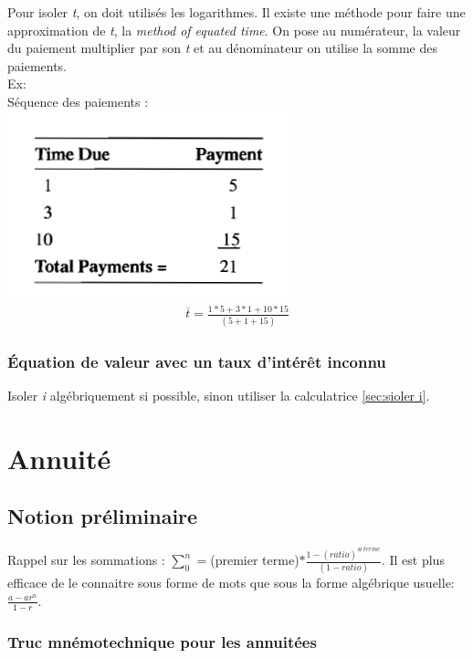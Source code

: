 \documentclass[11pt,french]{report}
\begin{document}
Pour isoler \textit{t}, on doit utilisés les logarithmes. Il existe une méthode pour faire une approximation de \textit{t}, la \emph{method of equated time}. On pose au numérateur, la valeur du paiement multiplier par son \textit{t} et au dénominateur on utilise la somme des paiements. 
\\Ex:
\\Séquence des paiements :
\\ \includegraphics[scale=0.60]{picture2.PNG} 
\begin{align*}
\overline{t} = \frac{1 * 5 + 3 * 1 + 10 * 15}{(5 + 1 + 15)}
\end{align*}

\subsection{Équation de valeur avec un taux d'intérêt inconnu}
\label{sec:Équation de valeur et i inconnu}

Isoler \textit{i} algébriquement si possible, sinon utiliser la calculatrice \ref{sec:sioler i}.


\chapter{Annuité}
\label{chap:annuité}

\section{Notion préliminaire}
\label{sec:Notion préliminaire}

Rappel sur les sommations : $ \sum_0^{n} = $(premier terme)$* \frac{1 - (ratio)^{\# \, terme}}{(1 - ratio)} $. Il est plus efficace de le connaitre sous forme de mots que sous la forme algébrique usuelle: $ \frac{a - ar^n}{1 - r} $.
\subsection{Truc mnémotechnique pour les annuitées}
\label{sec:astuce annuité}
\end{document}
